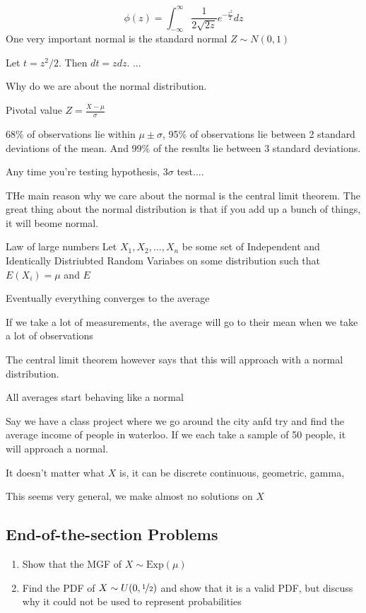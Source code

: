 \documentclass{report}
\begin{document}
\[
    \phi(z)=\int_{-\infty}^\infty \frac 1 {2\sqrt{2z}} e^{-\frac {z^2} 2}dz
\]
One very important normal is the standard normal $Z\sim N(0,1)$

Let $t=z^2/2$. Then $dt=zdz$. ...

Why do we are about the normal  distribution.

Pivotal value $Z=\frac{X-\mu}\sigma$

68\% of observations lie within $\mu\pm \sigma$, 95\% of observations lie between 2 standard deviations of the mean. And 99\% of the results lie between 3 standard deviations.

Any time you're testing hypothesis, $3\sigma$ test....


THe main reason why we care about the normal is the central limit theorem. The great thing about the normal distribution is that if you add up a bunch of things, it will beome normal. 

Law of large numbers
Let $X_1,X_2,...,X_n$ be some set of Independent and Identically Distriubted Random Variabes on some distribution such that $E(X_i)=\mu$ and $E$

Eventually everything converges to the average

If we take a lot of measurements, the average will go to their mean when we take a lot of observations

The central limit theorem however says that this will approach with a normal distribution.

All averages start behaving like a normal

Say we have a class project where we go around the city anfd try and find the average income of people in waterloo. If we each take a sample of 50 people, it will approach a normal.

It doesn't matter what $X$ is, it can be discrete continuous, geometric, gamma, 

This seems very general, we make almost no solutions on $X$







\subsection{End-of-the-section Problems}
\begin{enumerate}
    \item Show that the MGF of $X\sim \text{Exp}(\mu)$ \todo
    \item Find the PDF of $X\sim U(0,\nicefrac 1 2)$ and show that it is a valid PDF, but discuss why it could not be used to represent probabilities
\end{enumerate}
\end{document}
